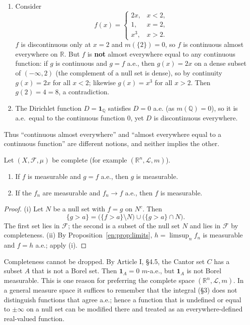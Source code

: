 \documentclass[11pt]{article}
\makeatletter
\newcommand{\envlabel}[1]{\protected@edef\@currentlabel{\themathenv}\label{#1}}
\makeatother
\begin{document}
\begin{example}\envlabel{en:ex:ae}
\leavevmode
\begin{enumerate}
  \item Consider
  \[
  f(x)=\begin{cases}2x,&x<2,\\1,&x=2,\\x^{3},&x>2.\end{cases}
  \]
  $f$ is discontinuous only at $x=2$ and $m(\{2\})=0$, so $f$ is continuous almost everywhere on $\mathbb{R}$. But $f$ is \textbf{not} almost everywhere equal to any continuous function: if $g$ is continuous and $g=f$ a.e., then $g(x)=2x$ on a dense subset of $(-\infty,2)$ (the complement of a null set is dense), so by continuity $g(x)=2x$ for all $x<2$; likewise $g(x)=x^{3}$ for all $x>2$. Then $g(2)=4=8$, a contradiction.
  \item The Dirichlet function $D=\mathbf{1}_{\mathbb{Q}}$ satisfies $D=0$ a.e. (as $m(\mathbb{Q})=0$), so it is a.e.\ equal to the continuous function $0$, yet $D$ is discontinuous everywhere.
\end{enumerate}
Thus ``continuous almost everywhere'' and ``almost everywhere equal to a continuous function'' are different notions, and neither implies the other.
\end{example}

\begin{proposition}\envlabel{en:prop:complete}
Let $(X,\mathcal{F},\mu)$ be complete (for example $(\mathbb{R}^{n},\mathcal{L},m)$).
\begin{enumerate}
  \item If $f$ is measurable and $g=f$ a.e., then $g$ is measurable.
  \item If the $f_{n}$ are measurable and $f_{n}\to f$ a.e., then $f$ is measurable.
\end{enumerate}
\end{proposition}

\begin{proof}
(i) Let $N$ be a null set with $f=g$ on $N^{c}$. Then
\[
\{g>a\}=\big(\{f>a\}\setminus N\big)\cup\big(\{g>a\}\cap N\big).
\]
The first set lies in $\mathcal{F}$; the second is a subset of the null set $N$ and lies in $\mathcal{F}$ by completeness. (ii) By Proposition~\ref{en:prop:limits}, $h=\limsup_{n}f_{n}$ is measurable and $f=h$ a.e.; apply (i).
\end{proof}

\begin{remark}
Completeness cannot be dropped. By Article I, \S4.5, the Cantor set $C$ has a subset $A$ that is not a Borel set. Then $\mathbf{1}_{A}=0$ $m$-a.e., but $\mathbf{1}_{A}$ is not Borel measurable. This is one reason for preferring the complete space $(\mathbb{R}^{n},\mathcal{L},m)$. In a general measure space it suffices to remember that the integral (\S3) does not distinguish functions that agree a.e.; hence a function that is undefined or equal to $\pm\infty$ on a null set can be modified there and treated as an everywhere-defined real-valued function.
\end{remark}
\end{document}
